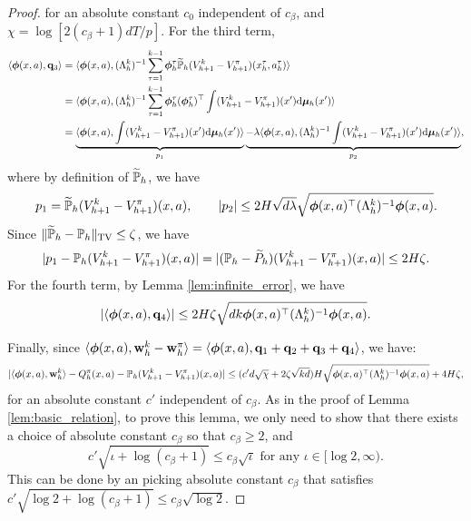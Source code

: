 \begin{proof}
for an absolute constant $c_0$ independent of $c_\beta$, and $\chi = \log [2(c_\beta+1)dT/p]$. For the third term,
\begin{align*}
\la \bphi(x, a), \q_3\ra &= \la \bphi(x, a), (\Lambda^k_h)^{-1}\sum_{\tau = 1}^{k-1} \bphi^\tau_h \tilde{\P}_h (V^{k}_{h+1} - V^\pi_{h+1})(x_h^\tau, a_h^\tau)\ra\\
&= \la \bphi(x, a), (\Lambda^k_h)^{-1}\sum_{\tau = 1}^{k-1} \bphi^\tau_h (\bphi^\tau_h)\trans \int (V^{k}_{h+1} - V^\pi_{h+1})(x') \dd \bmu_h(x')\ra\\
&= \underbrace{\la \bphi(x, a), \int (V^{k}_{h+1} - V^\pi_{h+1})(x') \dd \bmu_h(x')\ra}_{p_1}
\underbrace{-\lambda \la \bphi(x, a), (\Lambda^k_h)^{-1}\int (V^{k}_{h+1} - V^\pi_{h+1})(x') \dd \bmu_h(x') \ra}_{p_2}, 
\end{align*}
where by definition of $\tilde{\P}_h$, we have
\begin{align*}
p_1   = \tilde{\P}_h (V^{k}_{h+1} - V^\pi_{h+1})(x, a) , \qquad 
|p_2|  
\le 2 H \sqrt{d\lambda} \sqrt{\bphi(x, a)\trans (\Lambda^k_h)^{-1}  \bphi(x, a)}.
\end{align*}
Since $\|\tilde{\P}_h - \P_h\|_{\mathrm{TV}} \le \zeta$, we have 
\begin{equation*}
|p_1 - \P_h (V^{k}_{h+1} - V^\pi_{h+1})(x, a)| = |(\P_h-\tilde{P}_h) (V^{k}_{h+1} - V^\pi_{h+1})(x, a)| \le 2H\zeta.
\end{equation*}
For the fourth term, by Lemma \ref{lem:infinite_error}, we have
\begin{equation*}
|\la \bphi(x, a), \q_4\ra| \le 2H\zeta\sqrt{dk \bphi(x, a)\trans (\Lambda^k_h)^{-1}  \bphi(x, a)}. 
\end{equation*}

Finally, since $\la \bphi(x, a), \w^k_h - \w^\pi_h\ra =\la \bphi(x, a), \q_1 + \q_2 + \q_3 + \q_4\ra$, we have:
\begin{equation*}
|\la\bphi(x, a), \w^k_h\ra - Q_h^\pi(x, a)  -  \P_h (V^{k}_{h+1} - V^{\pi}_{h+1})(x, a)| \le (c' d\sqrt{\chi} + 2\zeta\sqrt{kd})H \sqrt{\bphi(x, a)\trans (\Lambda^k_h)^{-1}  \bphi(x, a)} + 4H\zeta,
\end{equation*}
for an absolute constant $c'$ independent of $c_{\beta}$. As in the proof of Lemma \ref{lem:basic_relation}, to prove this lemma, we only need to show that there exists a choice of absolute constant $c_\beta$ so that $c_\beta \ge 2$, and
\begin{equation*}
c' \sqrt{\iota + \log(c_\beta + 1)} \le c_\beta \sqrt{\iota}  \text{~for any~}\iota \in [\log 2, \infty).
\end{equation*}
This can be done by an picking absolute constant $c_\beta$ that satisfies $c'\sqrt{\log 2 + \log(c_\beta + 1)} \le c_\beta \sqrt{\log 2}$.
\end{proof}

